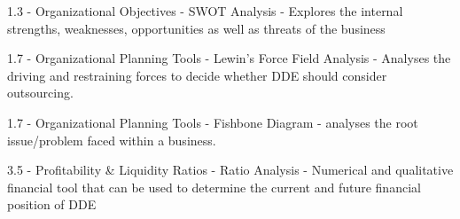 

{1.3 - Organizational Objectives - SWOT Analysis - Explores the internal strengths, weaknesses, opportunities as well as threats of the business}

{1.7 - Organizational Planning Tools - Lewin's Force Field Analysis - Analyses the driving and restraining forces to decide whether DDE should consider outsourcing.}

{1.7 - Organizational Planning Tools - Fishbone Diagram - analyses the root issue/problem faced within a business.}

{3.5 - Profitability & Liquidity Ratios - Ratio Analysis - Numerical and qualitative financial tool that can be used to determine the current and future financial position of DDE}
